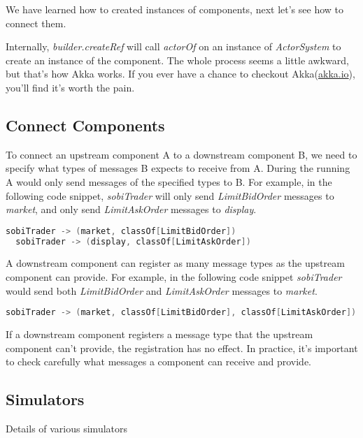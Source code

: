 We have learned how to created instances of components, next let's see how to connect them.

\begin{info}
Internally, \emph{builder.createRef} will call \emph{actorOf} on an instance of \emph{ActorSystem} to create an instance of the component. The whole process seems a little awkward, but that's how Akka works. If you ever have a chance to checkout Akka(\href{http://akka.io}{akka.io}), you'll find it's worth the pain.
\end{info}

\subsection{Connect Components}

To connect an upstream component A to a downstream component B, we need to specify what types of messages B expects to receive from A. During the running A would only send messages of the specified types to B. For example, in the following code snippet, \emph{sobiTrader} will only send \emph{LimitBidOrder} messages to \emph{market}, and only send \emph{LimitAskOrder} messages to \emph{display}.

\begin{lstlisting}[language=Scala]
  sobiTrader -> (market, classOf[LimitBidOrder])
  sobiTrader -> (display, classOf[LimitAskOrder])
\end{lstlisting}

A downstream component can register as many message types as the upstream component can provide. For example, in the following code snippet \emph{sobiTrader} would send both \emph{LimitBidOrder} and \emph{LimitAskOrder} messages to \emph{market}.

\begin{lstlisting}[language=Scala]
  sobiTrader -> (market, classOf[LimitBidOrder], classOf[LimitAskOrder])
\end{lstlisting}

If a downstream component registers a message type that the upstream component can't provide, the registration has no effect. In practice, it's important to check carefully what messages a component can receive and provide.

\subsection{Simulators}

Details of various simulators

